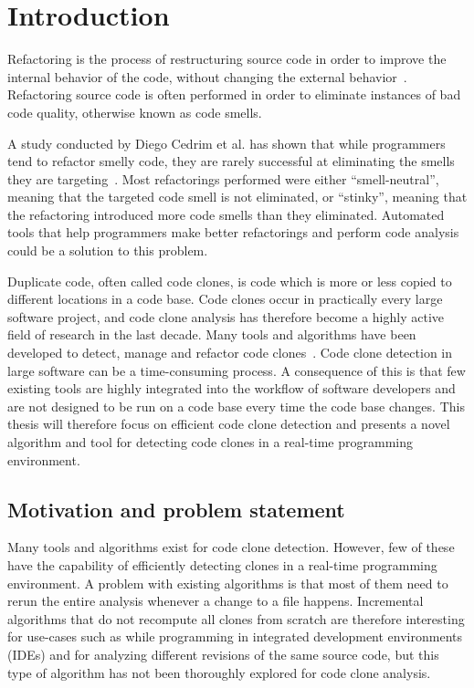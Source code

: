 \chapter{Introduction}

Refactoring is the process of restructuring source code in order to improve the internal
behavior of the code, without changing the external behavior~\cite[9]{fowlerrefactoring}.
Refactoring source code is often performed in order to eliminate instances of bad code
quality, otherwise known as code smells.

A study conducted by Diego Cedrim et al. has shown that while programmers tend to refactor
smelly code, they are rarely successful at eliminating the smells they are
targeting~\cite{Rohit_Gheyi_Impact}. Most refactorings performed were either
``smell-neutral'', meaning that the targeted code smell is not eliminated, or ``stinky'',
meaning that the refactoring introduced more code smells than they eliminated. Automated
tools that help programmers make better refactorings and perform code analysis could be a
solution to this problem. 

Duplicate code, often called code clones, is code which is more or less copied to
different locations in a code base. Code clones occur in practically every large software
project, and code clone analysis has therefore become a highly active field of research in
the last decade. Many tools and algorithms have been developed to detect, manage and
refactor code clones~\cite[6]{Inoue_introduction_to_cc}. Code clone detection in large
software can be a time-consuming process. A consequence of this is that few existing tools
are highly integrated into the workflow of software developers and are not designed to be
run on a code base every time the code base changes. This thesis will therefore focus
on efficient code clone detection and presents a novel algorithm and tool for detecting
code clones in a real-time programming environment.

\section{Motivation and problem statement}

Many tools and algorithms exist for code clone detection. However, few of these have the
capability of efficiently detecting clones in a real-time programming environment. A
problem with existing algorithms is that most of them need to rerun the entire analysis
whenever a change to a file happens. Incremental algorithms that do not recompute all
clones from scratch are therefore interesting for use-cases such as while programming in
integrated development environments (IDEs) and for analyzing different revisions of the
same source code, but this type of algorithm has not been thoroughly explored for code
clone analysis.

